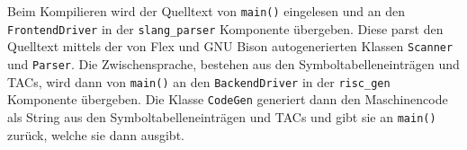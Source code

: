 Beim Kompilieren wird der Quelltext von \texttt{main()} eingelesen und an den \texttt{FrontendDriver} in der \texttt{slang\_parser} Komponente übergeben.
Diese parst den Quelltext mittels der von Flex und GNU Bison autogenerierten Klassen \texttt{Scanner} und \texttt{Parser}.
Die Zwischensprache, bestehen aus den Symboltabelleneinträgen und TACs, wird dann von \texttt{main()} an den \texttt{BackendDriver} in der \texttt{risc\_gen} Komponente übergeben.
Die Klasse \texttt{CodeGen} generiert dann den Maschinencode als String aus den Symboltabelleneinträgen und TACs und gibt sie an \texttt{main()} zurück, welche sie dann ausgibt.
